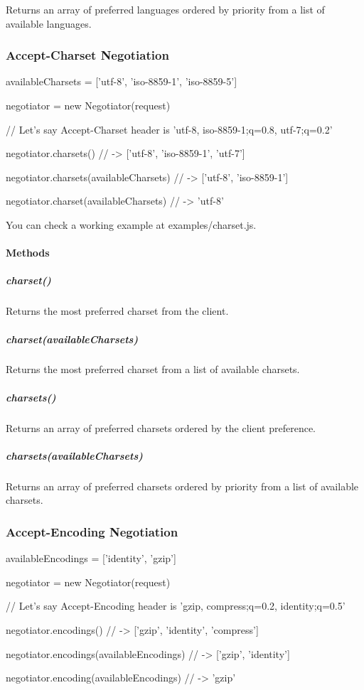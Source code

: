 Returns an array of preferred languages ordered by priority from a list of available languages.

\subsubsection*{Accept-\/\+Charset Negotiation}


\begin{DoxyCode}
availableCharsets = ['utf-8', 'iso-8859-1', 'iso-8859-5']

negotiator = new Negotiator(request)

// Let's say Accept-Charset header is 'utf-8, iso-8859-1;q=0.8, utf-7;q=0.2'

negotiator.charsets()
// -> ['utf-8', 'iso-8859-1', 'utf-7']

negotiator.charsets(availableCharsets)
// -> ['utf-8', 'iso-8859-1']

negotiator.charset(availableCharsets)
// -> 'utf-8'
\end{DoxyCode}


You can check a working example at {\ttfamily examples/charset.\+js}.

\paragraph*{Methods}

\subparagraph*{charset()}

Returns the most preferred charset from the client.

\subparagraph*{charset(available\+Charsets)}

Returns the most preferred charset from a list of available charsets.

\subparagraph*{charsets()}

Returns an array of preferred charsets ordered by the client preference.

\subparagraph*{charsets(available\+Charsets)}

Returns an array of preferred charsets ordered by priority from a list of available charsets.

\subsubsection*{Accept-\/\+Encoding Negotiation}


\begin{DoxyCode}
availableEncodings = ['identity', 'gzip']

negotiator = new Negotiator(request)

// Let's say Accept-Encoding header is 'gzip, compress;q=0.2, identity;q=0.5'

negotiator.encodings()
// -> ['gzip', 'identity', 'compress']

negotiator.encodings(availableEncodings)
// -> ['gzip', 'identity']

negotiator.encoding(availableEncodings)
// -> 'gzip'
\end{DoxyCode}


